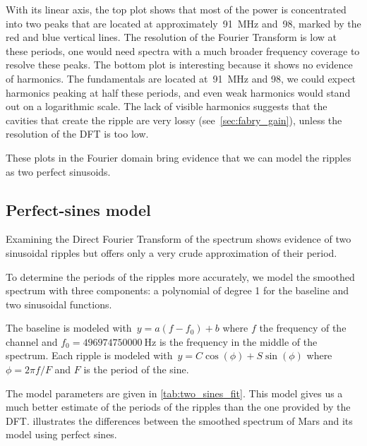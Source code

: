 With its linear axis, the top plot shows that most of the power is concentrated into two peaks that are located at approximately~\SI{91}{\mega\hertz} and~\SI{98}{\megahertz}, marked by the red and blue vertical lines.
The resolution of the Fourier Transform is low at these periods, one would need spectra with a much broader frequency coverage to resolve these peaks.
The bottom plot is interesting because it shows no evidence of harmonics.
The fundamentals are located at~\SI{91}{\mega\hertz} and \SI{98}{\megahertz}, we could expect harmonics peaking at half these periods, and even weak harmonics would stand out on a logarithmic scale.
The lack of visible harmonics suggests that the cavities that create the ripple are very lossy (see~\cref{sec:fabry_gain}), unless the resolution of the DFT is too low.

These plots in the Fourier domain bring evidence that we can model the ripples as two perfect sinusoids.




\subsection{Perfect-sines model}
\label{sec:perfect_sines_model}
Examining the Direct Fourier Transform of the spectrum shows evidence of two sinusoidal ripples but offers only a very crude approximation of their period.

To determine the periods of the ripples more accurately, we model the smoothed spectrum with three components: a polynomial of degree 1 for the baseline and two sinusoidal functions.

The baseline is modeled with~$y=a(f-f_0)+b$ where
$f$ the frequency of the channel and
$f_0=\SI{496974750000}{\hertz}$ is the frequency in the middle of the spectrum.
Each ripple is modeled with~$y = C \cos(\phi) + S \sin(\phi)$ where
$\phi = 2 \pi f / F$ and $F$ is the period of the sine.

The model parameters are given in \cref{tab:two_sines_fit}.
This model gives us a much better estimate of the periods of the ripples than the one provided by the DFT.
 illustrates the differences between the smoothed spectrum of Mars and its model using perfect sines.


